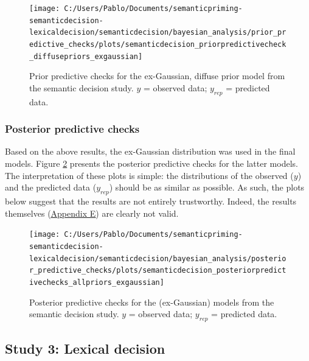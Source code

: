 \documentclass[
  12pt,
  man,floatsintext]{apa7}
\begin{document}
\begin{figure}

{\centering \texttt{[image: C:/Users/Pablo/Documents/semanticpriming-semanticdecision-lexicaldecision/semanticdecision/bayesian\_analysis/prior\_predictive\_checks/plots/semanticdecision\_priorpredictivecheck\_diffusepriors\_exgaussian]} 

}

\caption{Prior predictive checks for the ex-Gaussian, diffuse prior model from the semantic decision study. \(y\) = observed data; \(y_{rep}\) = predicted data.}\label{fig:semanticdecision-priorpredictivecheck-diffusepriors-exgaussian}
\end{figure}

\hypertarget{posterior-predictive-checks-1}{%
\subsubsection{Posterior predictive checks}\label{posterior-predictive-checks-1}}

Based on the above results, the ex-Gaussian distribution was used in the final models. Figure \ref{fig:semanticdecision-posteriorpredictivechecks-allpriors-exgaussian} presents the posterior predictive checks for the latter models. The interpretation of these plots is simple: the distributions of the observed (\(y\)) and the predicted data (\(y_{rep}\)) should be as similar as possible. As such, the plots below suggest that the results are not entirely trustworthy. Indeed, the results themselves (\protect\hyperlink{appendix-E-Bayesian-analysis-results}{\underline{Appendix E}}) are clearly not valid.



\begin{figure}

{\centering \texttt{[image: C:/Users/Pablo/Documents/semanticpriming-semanticdecision-lexicaldecision/semanticdecision/bayesian\_analysis/posterior\_predictive\_checks/plots/semanticdecision\_posteriorpredictivechecks\_allpriors\_exgaussian]} 

}

\caption{Posterior predictive checks for the (ex-Gaussian) models from the semantic decision study. \(y\) = observed data; \(y_{rep}\) = predicted data.}\label{fig:semanticdecision-posteriorpredictivechecks-allpriors-exgaussian}
\end{figure}

\hypertarget{study-3-lexical-decision-2}{%
\subsection{Study 3: Lexical decision}\label{study-3-lexical-decision-2}}
\end{document}
